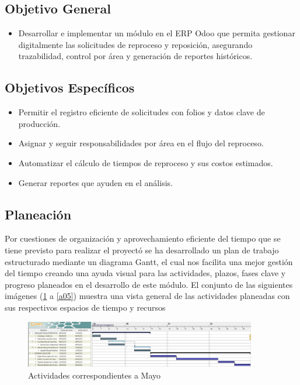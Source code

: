 \documentclass[12pt,letterpaper,spanish]{report}
\begin{document}
\subsection{Objetivo General}
\begin{itemize}
\item Desarrollar e implementar un módulo en el ERP Odoo que permita gestionar digitalmente las solicitudes de reproceso y reposición, asegurando trazabilidad, control por área y generación de reportes históricos.
\end{itemize}
\subsection{Objetivos Específicos}
\begin{itemize}
\item Permitir el registro eficiente de solicitudes con folios y datos clave de producción.
\item Asignar y seguir responsabilidades por área en el flujo del reproceso.
\item Automatizar el cálculo de tiempos de reproceso y sus costos estimados.
\item Generar reportes que ayuden en el análisis.
\end{itemize}
\subsection{Planeación}

Por cuestiones de organización y aprovechamiento eficiente del tiempo que se tiene previsto para realizar el proyectó se ha desarrollado un plan de trabajo estructurado mediante un diagrama Gantt, el cual nos facilita una mejor gestión del tiempo creando una ayuda visual para las actividades, plazos, fases clave y progreso planeados en el desarrollo de este módulo. El conjunto de las siguientes imágenes (\ref{a03} a \ref{a05}) muestra una vista general de las actividades planeadas con sus respectivos espacios de tiempo y recursos

\begin{figure}[htp]
  \centering
  \includegraphics[width=0.9\textwidth]{Gantt_Mayo_30.jpg}
  \caption{Actividades correspondientes a Mayo}\label{a03}
\end{figure}
\end{document}
